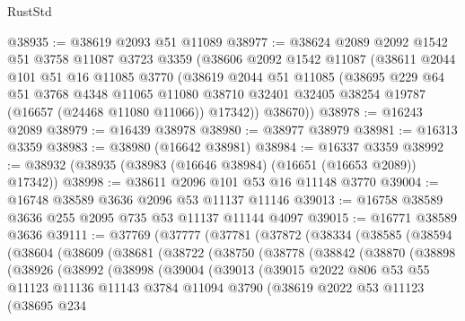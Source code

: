 \begin{lexlean}{RustStd}
\begin{coremodule}
@38935 := @38619 @2093 @51 @11089
@38977 := @38624
    @2089
    @2092
    @1542
    @51
    @3758
    @11087
    @3723
    @3359
    (@38606
      @2092
      @1542
      @11087
      (@38611
        @2044
        @101
        @51
        @16
        @11085
        @3770
        (@38619
          @2044
          @51
          @11085
          (@38695
            @229
            @64
            @51
            @3768
            @4348
            @11065
            @11080
            @38710
            @32401
            @32405
            @38254
            @19787
            (@16657 (@24468 @11080 @11066))
            @17342))
        @38670))
@38978 := @16243 @2089
@38979 := @16439 @38978
@38980 := @38977 @38979
@38981 := @16313 @3359
@38983 := @38980 (@16642 @38981)
@38984 := @16337 @3359
@38992 := @38932 (@38935 (@38983 (@16646 @38984) (@16651 (@16653 @2089)) @17342))
@38998 := @38611 @2096 @101 @53 @16 @11148 @3770
@39004 := @16748 @38589 @3636 @2096 @53 @11137 @11146
@39013 := @16758 @38589 @3636 @255 @2095 @735 @53 @11137 @11144 @4097
@39015 := @16771 @38589 @3636
@39111 := @37769
    (@37777
      (@37781
        (@37872
          (@38334
            (@38585
              (@38594
                (@38604
                  (@38609
                    (@38681
                      (@38722
                        (@38750
                          (@38778
                            (@38842
                              (@38870
                                (@38898
                                  (@38926
                                    (@38992
                                      (@38998
                                        (@39004
                                          (@39013
                                            (@39015
                                              @2022
                                              @806
                                              @53
                                              @55
                                              @11123
                                              @11136
                                              @11143
                                              @3784
                                              @11094
                                              @3790
                                              (@38619
                                                @2022
                                                @53
                                                @11123
                                                (@38695
                                                  @234

\end{coremodule}
\end{lexlean}
